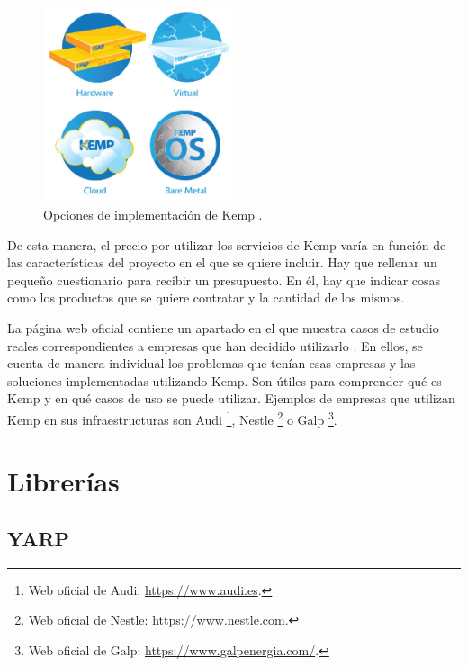 \documentclass[11pt,spanish,listoffigures]{tfgetsinf}
\begin{document}
\begin{figure}[ht]
\centering
\includegraphics[width=0.5\textwidth]{imagenes/productosKemp}
\caption[Opciones de implementación de Kemp.]{Opciones de implementación de Kemp \cite{Kemp_products}.}
	\label{productosKemp}
\end{figure}

De esta manera, el precio por utilizar los servicios de Kemp varía en función de las características del proyecto en el que se quiere incluir. Hay que rellenar un pequeño cuestionario para recibir un presupuesto. En él, hay que indicar cosas como los productos que se quiere contratar y la cantidad de los mismos.

La página web oficial contiene un apartado en el que muestra casos de estudio reales correspondientes a empresas que han decidido utilizarlo \cite{Kemp_empresas}. En ellos, se cuenta de manera individual los problemas que tenían esas empresas y las soluciones implementadas utilizando Kemp. Son útiles para comprender qué es Kemp y en qué casos de uso se puede utilizar. Ejemplos de empresas que utilizan Kemp en sus infraestructuras son Audi \footnote{Web oficial de Audi: \url{https://www.audi.es}.}, Nestle \footnote{Web oficial de Nestle: \url{https://www.nestle.com}.} o Galp \footnote{Web oficial de Galp: \url{https://www.galpenergia.com/}.}.


	\section{Librerías}


		\subsection{YARP}
\end{document}
